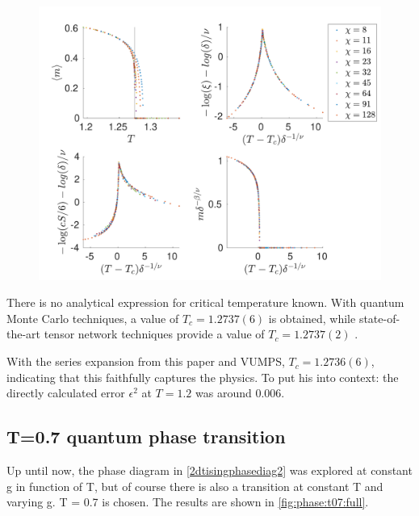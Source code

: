 \begin{figure}
    \center
    \includegraphics[width=\textwidth]{Figuren/phasediag/g25/zoomed.pdf}
    \caption{  }
    \label{fig:phase:g25:zoomed}
\end{figure}

There is no analytical expression for critical temperature known. With quantum Monte Carlo techniques, a value of $T_c=1.2737(6)$ is obtained, while state-of-the-art tensor network techniques provide a value of $T_c=1.2737(2)$ \cite{Czarnik2019}.

With the series expansion from this paper and VUMPS, $T_c=1.2736(6)$, indicating that this faithfully captures the physics. To put his into context: the directly calculated error $\epsilon^{2}$  at $T=1.2$ was around $0.006$.

\subsection{T=0.7 quantum phase transition}\label{tphasetranssubsec}

Up until now, the phase diagram in \cref{2dtisingphasediag2} was explored at constant g in function of T, but of course there is also a transition at constant T and varying g.  T = 0.7 is chosen. The results are shown in \cref{fig:phase:t07:full}.

